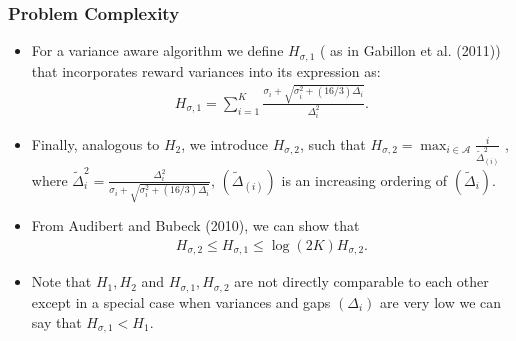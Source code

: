 \begin{frame}
\frametitle{Problem Complexity}
\begin{itemize}
\item<1-> For a variance aware algorithm we define $H_{\sigma , 1}$ ( as in {Gabillon et al. (2011)}) that incorporates reward variances into its expression as:
\begin{align*}
 H_{\sigma,1}=\sum_{i=1}^{K}\frac{\sigma_{i}+\sqrt{\sigma_{i}^{2}+(16/3)\Delta_{i}}}{\Delta_{i}^{2}}.
\end{align*}

\item<2-> Finally, analogous to $H_{2}$, we introduce $H_{\sigma,2}$, such that $
H_{\sigma,2}=\max_{i\in \mathcal{A}} \frac{i}{\tilde{\Delta}_{(i)}^{2}}$ , where $\tilde{\Delta}_{i}^{2}=\frac{\Delta_{i}^{2}}{\sigma_{i}+\sqrt{\sigma_{i}^{2}+(16/3)\Delta_{i}}}$,  $(\tilde{\Delta}_{(i)})$ is an increasing ordering of $(\tilde{\Delta}_{i})$.

\item<3-> From {Audibert and Bubeck (2010)}, we can show that
\begin{align*}
H_{\sigma,2}\le H_{\sigma,1} \le \log(2K) H_{\sigma,2}.
\end{align*}


\item<4-> Note that $H_1 , H_2 $ and $H_{\sigma,1}, H_{\sigma,2}$ are not directly comparable to each other except in a special case when variances and gaps $(\Delta_i)$ are very low we can say that $H_{\sigma,1} < H_{1} $.

\end{itemize}
\end{frame}




